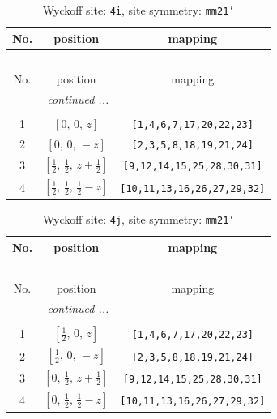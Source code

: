 \documentclass[fleqn,8pt]{jsarticle}
\begin{document}
\renewcommand{\arraystretch}{1.2}
\begin{longtable}{ccc}
\caption{Wyckoff site: {\tt 4i}, site symmetry: {\tt mm21'}}
 \\
 \hline \hline
No. & position & mapping \\ \hline \endfirsthead

\multicolumn{2}{l}{\tablename\ \thetable{}} \\
 \hline \hline
No. & position & mapping \\ \hline \endhead

 \hline \hline
\multicolumn{2}{r}{\footnotesize\it continued ...} \\ \endfoot

 \hline \hline
\multicolumn{2}{r}{} \\ \endlastfoot

1 & $\left[ 0,\, 0,\, z \right]$ & {\tt [1,4,6,7,17,20,22,23]} \\ \hline
2 & $\left[ 0,\, 0,\, - z \right]$ & {\tt [2,3,5,8,18,19,21,24]} \\ \hline
3 & $\left[ \frac{1}{2},\, \frac{1}{2},\, z + \frac{1}{2} \right]$ & {\tt [9,12,14,15,25,28,30,31]} \\ \hline
4 & $\left[ \frac{1}{2},\, \frac{1}{2},\, \frac{1}{2} - z \right]$ & {\tt [10,11,13,16,26,27,29,32]} \\
\end{longtable}
\renewcommand{\arraystretch}{1.2}
\begin{longtable}{ccc}
\caption{Wyckoff site: {\tt 4j}, site symmetry: {\tt mm21'}}
 \\
 \hline \hline
No. & position & mapping \\ \hline \endfirsthead

\multicolumn{2}{l}{\tablename\ \thetable{}} \\
 \hline \hline
No. & position & mapping \\ \hline \endhead

 \hline \hline
\multicolumn{2}{r}{\footnotesize\it continued ...} \\ \endfoot

 \hline \hline
\multicolumn{2}{r}{} \\ \endlastfoot

1 & $\left[ \frac{1}{2},\, 0,\, z \right]$ & {\tt [1,4,6,7,17,20,22,23]} \\ \hline
2 & $\left[ \frac{1}{2},\, 0,\, - z \right]$ & {\tt [2,3,5,8,18,19,21,24]} \\ \hline
3 & $\left[ 0,\, \frac{1}{2},\, z + \frac{1}{2} \right]$ & {\tt [9,12,14,15,25,28,30,31]} \\ \hline
4 & $\left[ 0,\, \frac{1}{2},\, \frac{1}{2} - z \right]$ & {\tt [10,11,13,16,26,27,29,32]} \\
\end{longtable}
\end{document}
